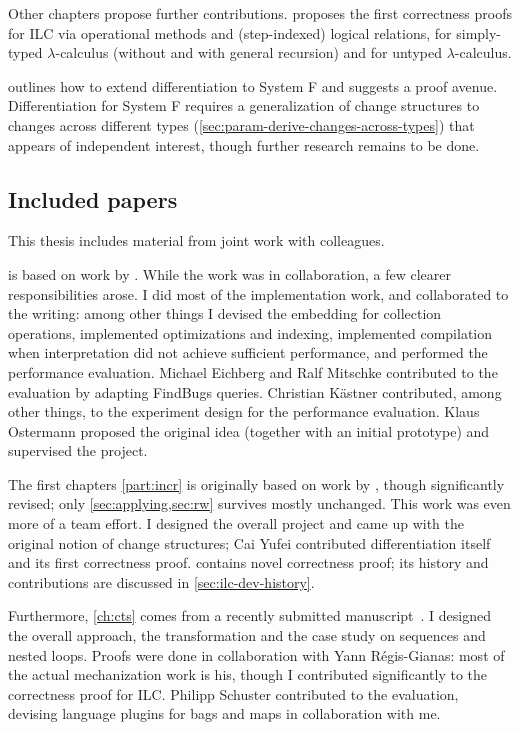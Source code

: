 
Other chapters propose further contributions.
 proposes the first correctness proofs for ILC via operational
methods and (step-indexed) logical relations, for simply-typed $\lambda$-calculus
(without and with general recursion) and for untyped $\lambda$-calculus.

 outlines how to extend differentiation to
System F and suggests a proof avenue. Differentiation for System F requires a
generalization of change structures to changes across different types
(\cref{sec:param-derive-changes-across-types}) that appears of independent
interest, though further research remains to be done.

\subsection{Included papers}
This thesis includes material from joint work with colleagues.

 is based on work by \citet*{GiarrussoAOSD13}. While the
work was in collaboration, a few clearer responsibilities arose.
I did most of the implementation work, and collaborated to the writing: among
other things I devised the embedding for collection operations, implemented
optimizations and indexing, implemented compilation when interpretation did not
achieve sufficient performance, and performed the performance evaluation.
Michael Eichberg and Ralf Mitschke contributed to the evaluation by adapting
FindBugs queries.
Christian K{\"{a}}stner contributed, among other things, to the experiment
design for the performance evaluation. Klaus Ostermann proposed the original
idea (together with an initial prototype) and supervised the project.

The first chapters \cref{part:incr} is originally based on work by \citet*{CaiEtAl2014ILC}, though
significantly revised; only \cref{sec:applying,sec:rw} survives mostly unchanged.
This work was even more of a team effort. I designed the
overall project and came up with the original notion of change structures; Cai
Yufei contributed differentiation itself and its first correctness proof.
 contains novel correctness proof; its history and
contributions are discussed in \cref{sec:ilc-dev-history}.

Furthermore, \cref{ch:cts} comes from a recently submitted
manuscript~\citep*{Giarrusso2018Static}. I
designed the overall approach, the transformation and the case study on
sequences and nested loops. Proofs were done in collaboration with Yann
Régis-Gianas: most of the actual mechanization work is his, though I contributed significantly to the
correctness proof for ILC. Philipp Schuster contributed to the evaluation,
devising language plugins for bags and maps in collaboration with me.


